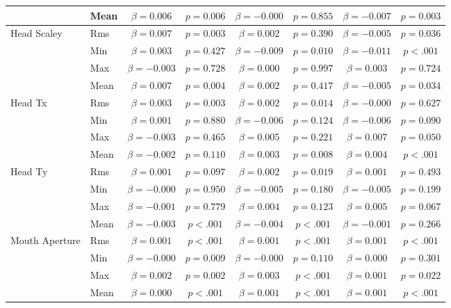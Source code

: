 \begin{tabular}{llcc|cc|cc}
 & Mean & $\beta = 0.006$ & $p = 0.006$ & $\beta = -0.000$ & $p = 0.855$ & $\beta = -0.007$ & $p = 0.003$ \\
\midrule
\multirow{4}{*}{Head Scaley} & Rms & $\beta = 0.007$ & $p = 0.003$ & $\beta = 0.002$ & $p = 0.390$ & $\beta = -0.005$ & $p = 0.036$ \\
 & Min & $\beta = 0.003$ & $p = 0.427$ & $\beta = -0.009$ & $p = 0.010$ & $\beta = -0.011$ & $p < .001$ \\
 & Max & $\beta = -0.003$ & $p = 0.728$ & $\beta = 0.000$ & $p = 0.997$ & $\beta = 0.003$ & $p = 0.724$ \\
 & Mean & $\beta = 0.007$ & $p = 0.004$ & $\beta = 0.002$ & $p = 0.417$ & $\beta = -0.005$ & $p = 0.034$ \\
\midrule
\multirow{4}{*}{Head Tx} & Rms & $\beta = 0.003$ & $p = 0.003$ & $\beta = 0.002$ & $p = 0.014$ & $\beta = -0.000$ & $p = 0.627$ \\
 & Min & $\beta = 0.001$ & $p = 0.880$ & $\beta = -0.006$ & $p = 0.124$ & $\beta = -0.006$ & $p = 0.090$ \\
 & Max & $\beta = -0.003$ & $p = 0.465$ & $\beta = 0.005$ & $p = 0.221$ & $\beta = 0.007$ & $p = 0.050$ \\
 & Mean & $\beta = -0.002$ & $p = 0.110$ & $\beta = 0.003$ & $p = 0.008$ & $\beta = 0.004$ & $p < .001$ \\
\midrule
\multirow{4}{*}{Head Ty} & Rms & $\beta = 0.001$ & $p = 0.097$ & $\beta = 0.002$ & $p = 0.019$ & $\beta = 0.001$ & $p = 0.493$ \\
 & Min & $\beta = -0.000$ & $p = 0.950$ & $\beta = -0.005$ & $p = 0.180$ & $\beta = -0.005$ & $p = 0.199$ \\
 & Max & $\beta = -0.001$ & $p = 0.779$ & $\beta = 0.004$ & $p = 0.123$ & $\beta = 0.005$ & $p = 0.067$ \\
 & Mean & $\beta = -0.003$ & $p < .001$ & $\beta = -0.004$ & $p < .001$ & $\beta = -0.001$ & $p = 0.266$ \\
\midrule
\multirow{4}{*}{Mouth Aperture} & Rms & $\beta = 0.001$ & $p < .001$ & $\beta = 0.001$ & $p < .001$ & $\beta = 0.001$ & $p < .001$ \\
 & Min & $\beta = -0.000$ & $p = 0.009$ & $\beta = -0.000$ & $p = 0.110$ & $\beta = 0.000$ & $p = 0.301$ \\
 & Max & $\beta = 0.002$ & $p = 0.002$ & $\beta = 0.003$ & $p < .001$ & $\beta = 0.001$ & $p = 0.022$ \\
 & Mean & $\beta = 0.000$ & $p < .001$ & $\beta = 0.001$ & $p < .001$ & $\beta = 0.001$ & $p < .001$ \\

\end{tabular}
